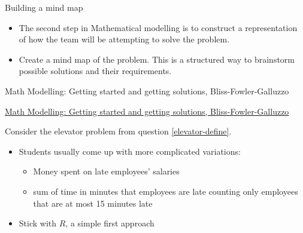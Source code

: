 \newpage


%
%



\begin{module}{Building a mind map}
	\label{mindmap}

	
	
\end{module}



\begin{lesson}

	\begin{itemize}
		\item The second step in Mathematical modelling is to construct a representation of how the team will be attempting to solve the problem.
		\item Create a mind map of the problem. This is a structured way to brainstorm possible solutions and their requirements.
	\end{itemize}
	

\begin{annotation}
	\begin{goals}
	Math Modelling: Getting started and getting solutions, Bliss-Fowler-Galluzzo
	
	\hfill {}	
	\end{goals}
\end{annotation}
	 \href{https://m3challenge.siam.org/resources/modeling-handbook}{Math Modelling: Getting started and getting solutions, Bliss-Fowler-Galluzzo}

\end{lesson}




\newpage


\question
\label{elevatorR}
Consider the elevator problem from question \ref{elevator-define}.


\begin{annotation}
	\begin{notes}
	\begin{itemize}
		\item Students usually come up with more complicated variations:
		\begin{itemize}
			\item Money spent on late employees' salaries
			\item sum of time in minutes that employees are late counting only employees that are at most 15 minutes late
		\end{itemize}
		\item Stick with $R$, a simple first approach
	\end{itemize}	
	\end{notes}
	
\end{annotation}

